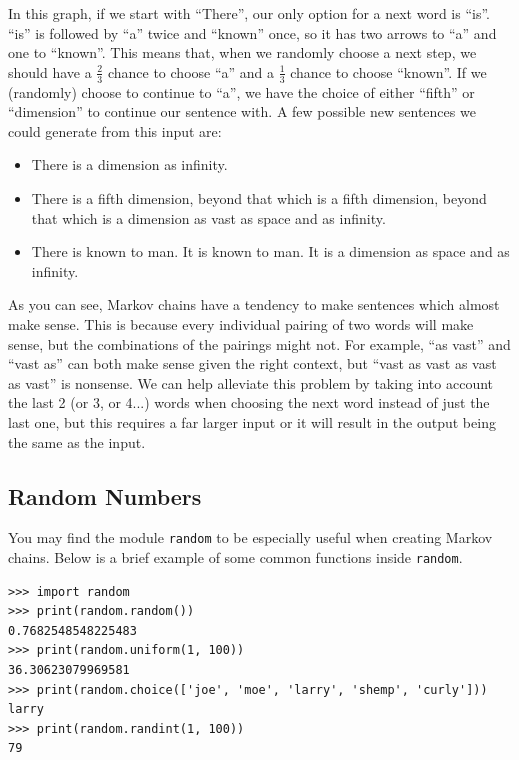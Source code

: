 \documentclass[11pt]{cselabheader}
\begin{document}
In this graph, if we start with ``There'', our only option for a next word is ``is''. ``is'' is followed by ``a'' twice and ``known'' once, so it has two arrows to ``a'' and one to ``known''. This means that, when we randomly choose a next step, we should have a $\frac{2}{3}$ chance to choose ``a'' and a $\frac{1}{3}$ chance to choose ``known''. If we (randomly) choose to continue to ``a'', we have the choice of either ``fifth'' or ``dimension'' to continue our sentence with. A few possible new sentences we could generate from this input are:
\begin{itemize}
\item There is a dimension as infinity.
\item There is a fifth dimension, beyond that which is a fifth dimension, beyond that which is a dimension as vast as space and as infinity.
\item There is known to man. It is known to man. It is a dimension as space and as infinity.
\end{itemize}

As you can see, Markov chains have a tendency to make sentences which almost make sense. This is because every individual pairing of two words will make sense, but the combinations of the pairings might not. For example, ``as vast'' and ``vast as'' can both make sense given the right context, but ``vast as vast as vast as vast'' is nonsense. We can help alleviate this problem by taking into account the last 2 (or 3, or 4...) words when choosing the next word instead of just the last one, but this requires a far larger input or it will result in the output being the same as the input.

\subsection{Random Numbers}
\label{subsec:random}
You may find the module \lstinline{random} to be especially useful when
creating Markov chains. Below is a brief example of some common functions
inside \lstinline{random}.

\begin{lstlisting}[style=ipython]
>>> import random
>>> print(random.random())
0.7682548548225483
>>> print(random.uniform(1, 100))
36.30623079969581
>>> print(random.choice(['joe', 'moe', 'larry', 'shemp', 'curly']))
larry
>>> print(random.randint(1, 100))
79
\end{lstlisting}
\end{document}
